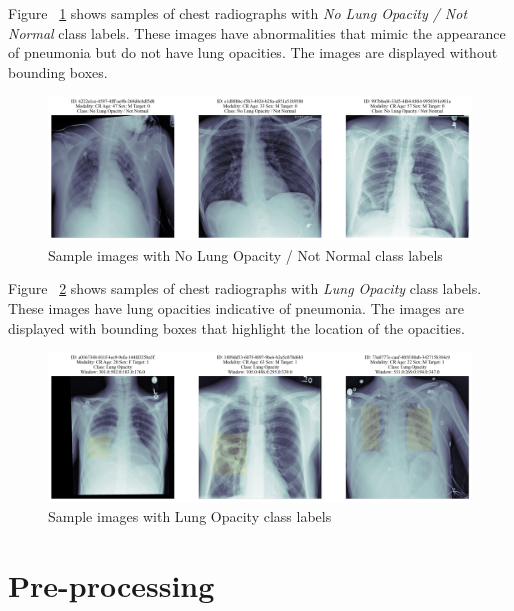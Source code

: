 Figure ~\ref{fig:cha-2 figure21} shows samples of chest radiographs with \emph{No Lung Opacity / Not Normal} class labels. These images have abnormalities that mimic the appearance of pneumonia but do not have lung opacities. The images are displayed without bounding boxes.

\begin{figure}[H]
    \begin{center}
        \includegraphics[width = \textwidth]{figures/Figure25.png}
        \caption{Sample images with No Lung Opacity / Not Normal class labels}
        \label{fig:cha-2 figure21}
    \end{center}
\end{figure}

Figure ~\ref{fig:cha-2 figure22} shows samples of chest radiographs with \emph{Lung Opacity} class labels. These images have lung opacities indicative of pneumonia. The images are displayed with bounding boxes that highlight the location of the opacities.

\begin{figure}[H]
    \begin{center}
        \includegraphics[width = \textwidth]{figures/Figure27.png}
        \caption{Sample images with Lung Opacity class labels}
        \label{fig:cha-2 figure22}
    \end{center}
\end{figure}

\section{Pre-processing}
\label{sec:chap2 section 2}

